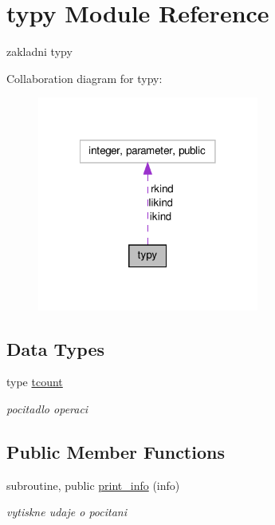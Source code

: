 \hypertarget{classtypy}{\section{typy \-Module \-Reference}
\label{classtypy}
}


zakladni typy  




\-Collaboration diagram for typy\-:\nopagebreak
\begin{figure}[H]
\begin{center}
\leavevmode
\includegraphics[width=206pt]{classtypy__coll__graph}
\end{center}
\end{figure}
\subsection*{\-Data \-Types}
\begin{DoxyCompactItemize}
\item 
type \hyperlink{structtypy_1_1tcount}{tcount}
\begin{DoxyCompactList}\small\item\em pocitadlo operaci \end{DoxyCompactList}\end{DoxyCompactItemize}
\subsection*{\-Public \-Member \-Functions}
\begin{DoxyCompactItemize}
\item 
subroutine, public \hyperlink{classtypy_a33123a40a2f37a906b69811afdae4451}{print\-\_\-info} (info)
\begin{DoxyCompactList}\small\item\em vytiskne udaje o pocitani \end{DoxyCompactList}\end{DoxyCompactItemize}
